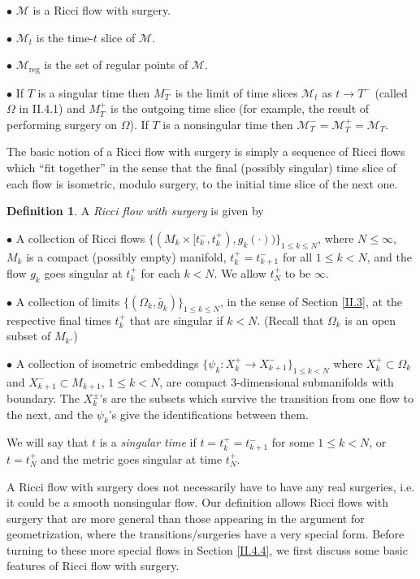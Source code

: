 \documentclass[12pt]{amsart}
\newcommand{\M}{{\mathcal M}}
\newcommand{\Om}{\Omega}
\newcommand{\reg}{\operatorname{reg}}
\newcommand{\ra}{\rightarrow}
\numberwithin{equation}{section}
\theoremstyle{plain}
\theoremstyle{definition}
\newtheorem{definition}[equation]{Definition}
\theoremstyle{remark}
\begin{document}
$\bullet$ $\M$ is a Ricci flow with surgery.

$\bullet$ $\M_t$ is the time-$t$ slice of $\M$.

$\bullet$ $\M_{\reg}$ is the set of regular points of $\M$.

$\bullet$ If $T$ is a singular time then $M_T^-$ is the limit of time slices
$\M_t$ as $t \rightarrow T^-$ (called $\Omega$ in II.4.1) and
$M_T^+$ is the outgoing time slice (for example,  the result of performing
surgery on $\Omega$). If $T$ is a nonsingular time then
$\M_T^- = \M_T^+ = \M_T$. 

The basic notion of a Ricci flow with surgery is simply a sequence of
Ricci flows which ``fit together'' in the sense that the final 
(possibly singular) time slice 
of each flow is isometric, modulo surgery, to the initial time slice
of the next one. 
\begin{definition}   \label{flowwithsurgery}
A {\em Ricci flow with surgery} is given by 

$\bullet$   A collection of Ricci flows
$\{(M_k\times[t_k^-,t_k^+),g_k(\cdot))\}_{1\leq k \leq N}$,
where $N\leq \infty$, $M_k$ is a compact (possibly empty) manifold,
$t_k^+=t_{k+1}^-$ for  all
$1\leq k<N$, and the flow $g_k$ 
goes singular at $t_k^+$ 
for each $k < N$. We allow $t_N^+$ to be $\infty$.

$\bullet$ A collection of limits
$\{(\Om_k,\bar g_k)\}_{1\leq k\leq N}$, in the sense of Section \ref{II.3},
at the respective final times $t_k^+$ that are
singular if $k < N$. (Recall that
$\Omega_k$ is an open subset of
$M_k$.)

$\bullet$ A collection of isometric embeddings 
$\{\psi_k:X_k^+\ra X_{k+1}^-\}_{1\leq k<N}$
where $X_k^+\subset \Om_k$ and $X_{k+1}^-\subset M_{k+1}$,
$1 \le k< N$, are compact $3$-dimensional submanifolds with 
boundary.   The $X_k^\pm$'s are the subsets which survive the 
transition from one flow to the next, and the $\psi_k$'s give
the identifications between them.   

We will say that $t$ is a {\em singular time} if $t=t_k^+=t_{k+1}^-$
for some $1\leq k<N$, or $t=t_N^+$ and the metric goes singular
at time $t_N^+$.
\end{definition}

A Ricci flow with surgery does not necessarily have to have any
real surgeries, i.e. it could be a smooth nonsingular flow. 
Our definition allows Ricci flows with surgery that are more
general than those appearing in the argument for geometrization,
where the transitions/surgeries have a very special form.  Before
turning to these more special flows in Section \ref{II.4.4}, 
we first discuss some 
basic features of Ricci flow with surgery.
\end{document}
